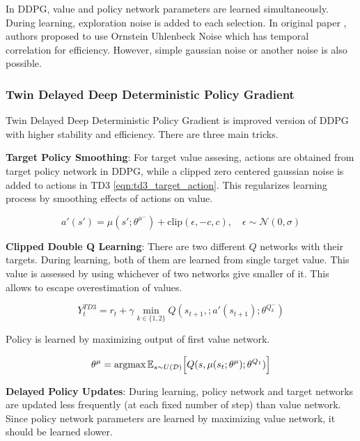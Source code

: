 In DDPG, value and policy network parameters are learned simultaneously. During learning, exploration noise is added to each selection. In original paper \cite{lillicrap_continuous_2019}, authors proposed to use Ornstein Uhlenbeck Noise \cite{uhlenbeck_theory_1930} which has temporal correlation for efficiency. However, simple gaussian noise or another noise is also possible.

\subsubsection{Twin Delayed Deep Deterministic Policy Gradient}
Twin Delayed Deep Deterministic Policy Gradient \cite{fujimoto_addressing_2018} is improved version of DDPG with higher stability and efficiency. There are three main tricks.

\textbf{Target Policy Smoothing}: For target value assesing, actions are obtained from target policy network in DDPG, while a clipped zero centered gaussian noise is added to actions in TD3 \ref{eqn:td3_target_action}. This regularizes learning process by smoothing effects of actions on value. 

\begin{equation}
\label{eqn:td3_target_action}
a'(s') = \mu(s';\theta^{\mu^-}) + \text{clip}(\epsilon, -c, c), \quad \epsilon \sim \mathcal{N}(0, \sigma)
\end{equation}

\textbf{Clipped Double Q Learning}: There are two different $Q$ networks with their targets. During learning, both of them are learned from single target value. This value is assessed by using whichever of two networks give smaller of it. This allows to escape overestimation of values. 

\begin{equation}
\label{eqn:td3_target}
Y_t^{TD3} = r_t + \gamma \min_{k\in\{1,2\}} Q(s_{t+1}, ;a'(s_{t+1});\theta^{Q_k^-})
\end{equation}

Policy is learned by maximizing output of first value network.

\begin{equation}
\label{eqn:td3_value_maximization}
\theta^\mu = \operatorname{\textup{argmax}} \mathbb{E}_{s \sim U(\mathcal{D})} \Big[ Q(s, \mu(s_t;\theta^\mu);\theta^{Q_1}) \Big]
\end{equation}

\textbf{Delayed Policy Updates}: During learning, policy network and target networks are updated less frequently (at each fixed number of step) than value network. Since policy network parameters are learned by maximizing value network, it should be learned slower.